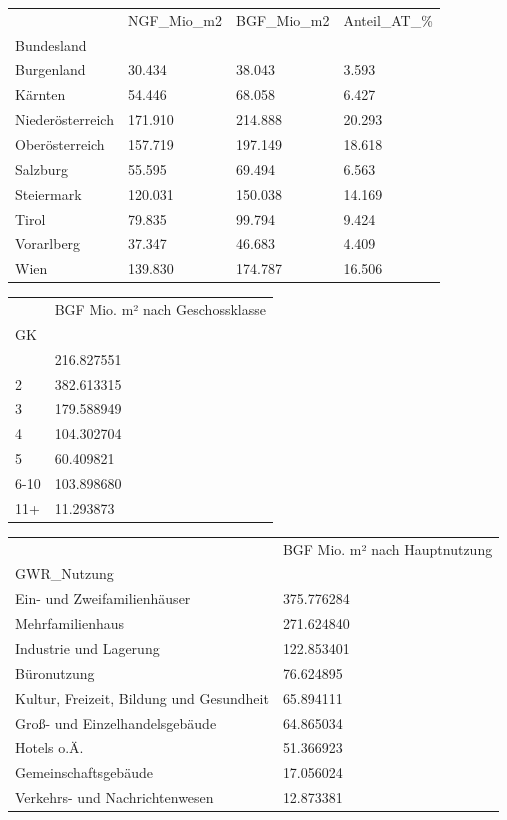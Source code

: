 \documentclass[
  ngerman,
  a4paper,
  DIV=11]{scrreprt}
\newcounter{none} %
\begin{document}
{\def\LTcaptype{none} %
\begin{longtable}[]{@{}llll@{}}
\toprule\noalign{}
& NGF\_Mio\_m2 & BGF\_Mio\_m2 & Anteil\_AT\_\% \\
Bundesland & & & \\
\midrule\noalign{}
\endhead
\bottomrule\noalign{}
\endlastfoot
Burgenland & 30.434 & 38.043 & 3.593 \\
Kärnten & 54.446 & 68.058 & 6.427 \\
Niederösterreich & 171.910 & 214.888 & 20.293 \\
Oberösterreich & 157.719 & 197.149 & 18.618 \\
Salzburg & 55.595 & 69.494 & 6.563 \\
Steiermark & 120.031 & 150.038 & 14.169 \\
Tirol & 79.835 & 99.794 & 9.424 \\
Vorarlberg & 37.347 & 46.683 & 4.409 \\
Wien & 139.830 & 174.787 & 16.506 \\
\end{longtable}
}

{\def\LTcaptype{none} %
\begin{longtable}[]{@{}ll@{}}
\toprule\noalign{}
& BGF Mio. m² nach Geschossklasse \\
GK & \\
\midrule\noalign{}
\endhead
\bottomrule\noalign{}
\endlastfoot
1 & 216.827551 \\
2 & 382.613315 \\
3 & 179.588949 \\
4 & 104.302704 \\
5 & 60.409821 \\
6-10 & 103.898680 \\
11+ & 11.293873 \\
\end{longtable}
}

{\def\LTcaptype{none} %
\begin{longtable}[]{@{}ll@{}}
\toprule\noalign{}
& BGF Mio. m² nach Hauptnutzung \\
GWR\_Nutzung & \\
\midrule\noalign{}
\endhead
\bottomrule\noalign{}
\endlastfoot
Ein- und Zweifamilienhäuser & 375.776284 \\
Mehrfamilienhaus & 271.624840 \\
Industrie und Lagerung & 122.853401 \\
Büronutzung & 76.624895 \\
Kultur, Freizeit, Bildung und Gesundheit & 65.894111 \\
Groß- und Einzelhandelsgebäude & 64.865034 \\
Hotels o.Ä. & 51.366923 \\
Gemeinschaftsgebäude & 17.056024 \\
Verkehrs- und Nachrichtenwesen & 12.873381 \\
\end{longtable}
}
\end{document}
